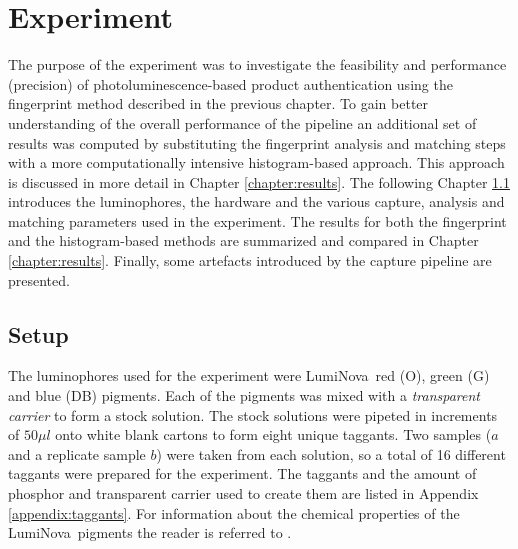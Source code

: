 \documentclass[thesis.tex]{subfiles}
\begin{document}
\chapter{Experiment}
\label{chapter:experiment}

The purpose of the experiment was to investigate the feasibility and performance (precision) of photoluminescence-based product authentication using the fingerprint method described in the previous chapter. To gain better understanding of the overall performance of the pipeline an additional set of results was computed by substituting the fingerprint analysis and matching steps with a more computationally intensive histogram-based approach. This approach is discussed in more detail in Chapter \ref{chapter:results}. The following Chapter \ref{chapter:setup} introduces the luminophores, the hardware and the various capture, analysis and matching parameters used in the experiment. The results for both the fingerprint and the histogram-based methods are summarized and compared in Chapter \ref{chapter:results}. Finally, some artefacts introduced by the capture pipeline are presented.

\section{Setup}
\label{chapter:setup}

The luminophores used for the experiment were LumiNova\textregistered\ red (O), green (G) and blue (DB) pigments. Each of the pigments was mixed with a \emph{transparent carrier} to form a stock solution. The stock solutions were pipeted in increments of $50\mu l$ onto white blank cartons to form eight unique taggants. Two samples ($a$ and a replicate sample $b$) were taken from each solution, so a total of 16 different taggants were prepared for the experiment. The taggants and the amount of phosphor and transparent carrier used to create them are listed in Appendix \ref{appendix:taggants}. For information about the chemical properties of the LumiNova\textregistered\ pigments the reader is referred to \cite{luminova}.
\end{document}
